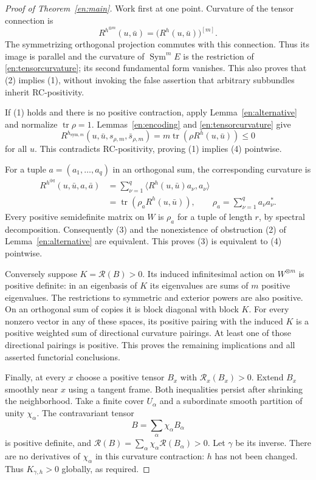 \documentclass[12pt]{amsart}
\theoremstyle{definition}
\theoremstyle{remark}
\numberwithin{equation}{section}
\DeclareMathOperator{\tr}{tr}
\DeclareMathOperator{\Sym}{Sym}
\theoremstyle{definition}
\begin{document}
\begin{proof}[Proof of Theorem~\ref{en:main}]
Work first at one point. Curvature of the tensor connection is
\begin{equation}\label{en:tensorcurvature}
 R^{h^{\otimes m}}(u,\bar u)=\bigl(R^h(u,\bar u)\bigr)^{[m]}.
\end{equation}
The symmetrizing orthogonal projection commutes with this connection.
Thus its image is parallel and the curvature of $\Sym^m E$ is the
restriction of \eqref{en:tensorcurvature}; its second fundamental form
vanishes. This also proves that (2) implies (1), without invoking the
false assertion that arbitrary subbundles inherit RC-positivity.

If (1) holds and there is no positive contraction, apply
Lemma~\ref{en:alternative} and normalize $\tr\rho=1$.
Lemmas~\ref{en:encoding} and \eqref{en:tensorcurvature} give
\[
 R^{h_{\mathrm{sym},m}}(u,\bar u,s_{\rho,m},\bar s_{\rho,m})
 =m\tr(\rho R^h(u,\bar u))\leq0
\]
for all $u$. This contradicts RC-positivity, proving (1) implies (4)
pointwise.

For a tuple $a=(a_1,\ldots,a_q)$ in an orthogonal sum, the corresponding
curvature is
\begin{equation}\label{en:sumcurvature}
\begin{aligned}
 R^{h^{\oplus q}}(u,\bar u,a,\bar a)
 &=\sum_{\nu=1}^q\langle R^h(u,\bar u)a_\nu,a_\nu\rangle\\
 &=\tr(\rho_aR^h(u,\bar u)),\qquad
 \rho_a=\sum_{\nu=1}^q a_\nu a_\nu^*.
\end{aligned}
\end{equation}
Every positive semidefinite matrix on $W$ is $\rho_a$ for a tuple of
length $r$, by spectral decomposition. Consequently (3) and the
nonexistence of obstruction (2) of Lemma~\ref{en:alternative} are
equivalent. This proves (3) is equivalent to (4) pointwise.

Conversely suppose $K=\mathcal R(B)>0$. Its induced infinitesimal action
on $W^{\otimes m}$ is positive definite: in an eigenbasis of $K$ its
eigenvalues are sums of $m$ positive eigenvalues. The restrictions to
symmetric and exterior powers are also positive. On an orthogonal sum
of copies it is block diagonal with block $K$. For every nonzero vector
in any of these spaces, its positive pairing with the induced $K$ is a
positive weighted sum of directional curvature pairings. At least one
of those directional pairings is positive. This proves the remaining
implications and all asserted functorial conclusions.

Finally, at every $x$ choose a positive tensor $B_x$ with
$\mathcal R_x(B_x)>0$. Extend $B_x$ smoothly near $x$ using a tangent
frame. Both inequalities persist after shrinking the neighborhood.
Take a finite cover $U_\alpha$ and a subordinate smooth partition of
unity $\chi_\alpha$. The contravariant tensor
\[
 B=\sum_\alpha\chi_\alpha B_\alpha
\]
is positive definite, and
$\mathcal R(B)=\sum_\alpha\chi_\alpha\mathcal R(B_\alpha)>0$.
Let $\gamma$ be its inverse. There are no derivatives of
$\chi_\alpha$ in this curvature contraction: $h$ has not been changed.
Thus $K_{\gamma,h}>0$ globally, as required.
\end{proof}
\end{document}
